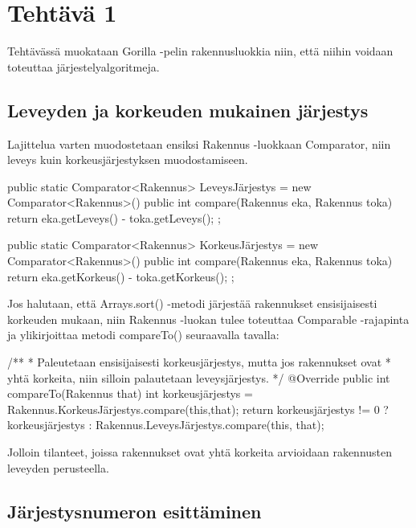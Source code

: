 
\chapter{Tehtävä 1 \label{chap:Teht=0000E4v=0000E4-1}}

Tehtävässä muokataan Gorilla -pelin rakennusluokkia niin, että niihin voidaan
toteuttaa järjestelyalgoritmeja.

\section{Leveyden ja korkeuden mukainen järjestys}

\label{}

Lajittelua varten muodostetaan ensiksi Rakennus -luokkaan Comparator, niin
leveys kuin korkeusjärjestyksen muodostamiseen.

\begin{javacode}
public static Comparator<Rakennus> LeveysJärjestys = new Comparator<Rakennus>() {
	public int compare(Rakennus eka, Rakennus toka) {
		return eka.getLeveys() - toka.getLeveys();
	}
};

public static Comparator<Rakennus> KorkeusJärjestys = new Comparator<Rakennus>() {
	public int compare(Rakennus eka, Rakennus toka) {
		return eka.getKorkeus() - toka.getKorkeus();
	}
};
\end{javacode}

Jos halutaan, että Arrays.sort() -metodi järjestää rakennukset ensisijaisesti
korkeuden mukaan, niin Rakennus -luokan tulee toteuttaa Comparable -rajapinta ja
ylikirjoittaa metodi compareTo() seuraavalla tavalla:

\begin{javacode}
/**
 * Paleutetaan ensisijaisesti korkeusjärjestys, mutta jos rakennukset ovat 
 * yhtä korkeita, niin silloin palautetaan leveysjärjestys.
 */
@Override
public int compareTo(Rakennus that) {
	int korkeusjärjestys = Rakennus.KorkeusJärjestys.compare(this,that);
	return korkeusjärjestys != 0 ? 
		korkeusjärjestys : Rakennus.LeveysJärjestys.compare(this, that); 
}
\end{javacode}

Jolloin tilanteet, joissa rakennukset ovat yhtä korkeita arvioidaan rakennusten
leveyden perusteella.

\section{Järjestysnumeron esittäminen}

\label{}

